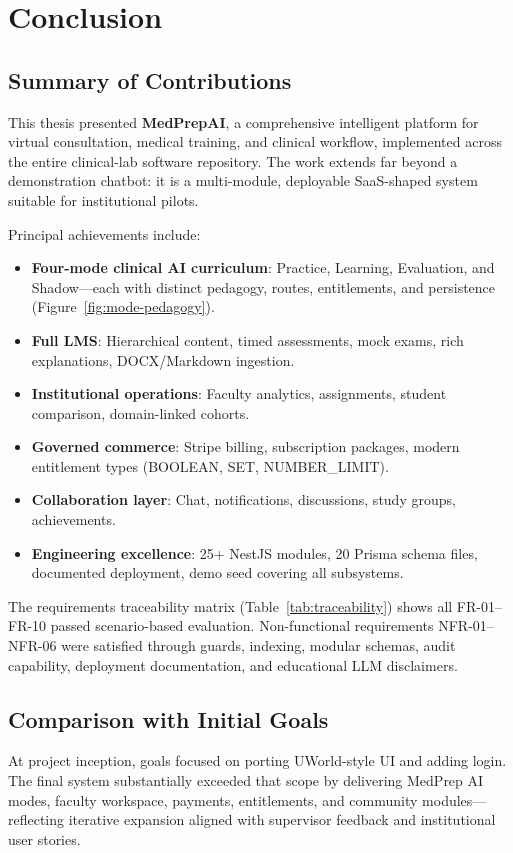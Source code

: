 \chapter{Conclusion}
\label{ch:conclusion}

\section{Summary of Contributions}
This thesis presented \textbf{MedPrepAI}, a comprehensive intelligent platform for virtual consultation, medical training, and clinical workflow, implemented across the entire clinical-lab software repository. The work extends far beyond a demonstration chatbot: it is a multi-module, deployable SaaS-shaped system suitable for institutional pilots.

Principal achievements include:
\begin{itemize}
  \item \textbf{Four-mode clinical AI curriculum}: Practice, Learning, Evaluation, and Shadow---each with distinct pedagogy, routes, entitlements, and persistence (Figure~\ref{fig:mode-pedagogy}).
  \item \textbf{Full LMS}: Hierarchical content, timed assessments, mock exams, rich explanations, DOCX/Markdown ingestion.
  \item \textbf{Institutional operations}: Faculty analytics, assignments, student comparison, domain-linked cohorts.
  \item \textbf{Governed commerce}: Stripe billing, subscription packages, modern entitlement types (BOOLEAN, SET, NUMBER\_LIMIT).
  \item \textbf{Collaboration layer}: Chat, notifications, discussions, study groups, achievements.
  \item \textbf{Engineering excellence}: 25+ NestJS modules, 20 Prisma schema files, documented deployment, demo seed covering all subsystems.
\end{itemize}

The requirements traceability matrix (Table~\ref{tab:traceability}) shows all FR-01--FR-10 passed scenario-based evaluation. Non-functional requirements NFR-01--NFR-06 were satisfied through guards, indexing, modular schemas, audit capability, deployment documentation, and educational LLM disclaimers.

\section{Comparison with Initial Goals}
At project inception, goals focused on porting UWorld-style UI and adding login. The final system substantially exceeded that scope by delivering MedPrep AI modes, faculty workspace, payments, entitlements, and community modules---reflecting iterative expansion aligned with supervisor feedback and institutional user stories.

